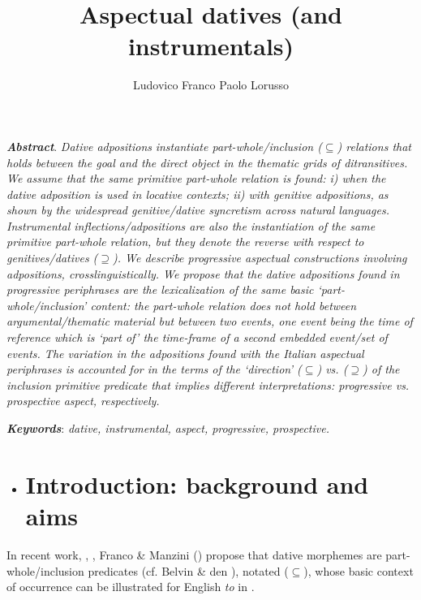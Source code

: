 \documentclass[output=paper,colorlinks,citecolor=brown]{./langscibook}
\author{Ludovico Franco\affiliation{}\lastand 
Paolo Lorusso\affiliation{}}
\title{Aspectual datives (and instrumentals)}
\begin{document}
 

\textbf{\textit{Abstract}}. \textit{Dative adpositions}\textbf{ }\textit{instantiate part-whole/inclusion (${\subseteq}$) relations that holds between the goal and the direct object in the thematic grids of ditransitives. We assume that the same primitive part-whole relation is found: i) when the dative adposition is used in locative contexts; ii) with genitive adpositions, as shown by the widespread genitive/dative syncretism across natural languages. Instrumental inflections/adpositions are also the instantiation of the same primitive part-whole relation, but they denote the reverse with respect to genitives/datives (${\supseteq}$). We describe progressive aspectual constructions involving adpositions, crosslinguistically. We propose that the dative adpositions found in progressive periphrases are the lexicalization of the same basic ‘part-whole/inclusion’ content: the part-whole relation does not hold between argumental/thematic material but between two events, one event being the time of reference which is ‘part of’ the time-frame of a second embedded event/set of events. The variation in the adpositions found with the Italian aspectual periphrases is accounted for in the terms of the ‘direction’ (${\subseteq}$) vs. (${\supseteq}$) of the inclusion primitive predicate that implies different interpretations:  progressive vs. prospective aspect, respectively.} 

\textbf{\textit{Keywords}}: \textit{dative, instrumental, aspect, progressive, prospective.}

\begin{itemize}
\item \section{Introduction: background and aims}
\end{itemize}

In recent work, \citet{ManziniSavoia2011}, \citet{ManziniFranco2016}, Franco \& Manzini (\citeyear{FrancoManzini2017Gen, FrancoManzini2017Ins}) propose that dative morphemes are part-whole/inclusion predicates (cf. Belvin \& den \citealt{Dikken1997}), notated (${\subseteq}$), whose basic context of occurrence can be illustrated for English \textit{to} in .

\ea%
    \label{ex:key:1}
    \gll\\
        \\
    \glt
    \z
\end{document}

